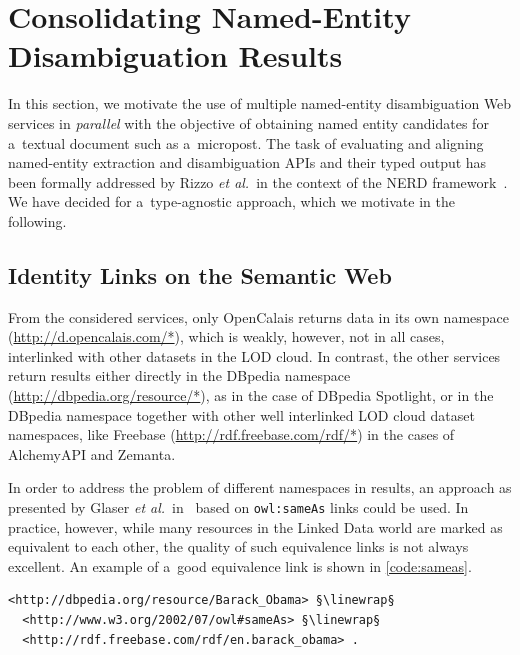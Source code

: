 \section{Consolidating Named-Entity Disambiguation Results} 
\label{sec:consolidate}

In this section, we motivate the use of multiple
named-entity disambiguation Web services in \emph{parallel}
with the objective of obtaining named entity candidates
for a~textual document such as a~micropost.
The task of evaluating and aligning named-entity extraction and
disambiguation APIs and their typed output
has been formally addressed by Rizzo \emph{et al.}\
in the context of the NERD
framework~\cite{rizzo2011nerd,rizzo2012nerd}.
We have decided for a~type-agnostic approach,
which we motivate in the following.

\subsection{Identity Links on the Semantic Web}
\label{sec:sameasorg}

From the considered services, only OpenCalais returns data in its
own namespace (\url{http://d.opencalais.com/*}), which is
weakly, however, not in all cases,
interlinked with other datasets in the LOD cloud.
In contrast, the other services return results either directly
in the DBpedia namespace (\url{http://dbpedia.org/resource/*}),
as in the case of DBpedia Spotlight,
or in the DBpedia namespace together with other
well interlinked LOD cloud dataset namespaces, like Freebase
(\url{http://rdf.freebase.com/rdf/*}) in the cases of
AlchemyAPI and Zemanta.

In order to address the problem of different namespaces in results,
an approach as presented by Glaser \emph{et al.}\ 
in~\cite{glaser2009sameas} based on \texttt{owl:sameAs} links
could be used.
In practice, however, while many resources in the Linked Data
world are marked as equivalent to each other,
the quality of such equivalence links is not always excellent.
An example of a~good equivalence link is shown in \autoref{code:sameas}.

\begin{lstlisting}[caption={Example of a~good equivalence link},
  label={code:sameas},
  escapechar=§]
<http://dbpedia.org/resource/Barack_Obama> §\linewrap§
  <http://www.w3.org/2002/07/owl#sameAs> §\linewrap§
  <http://rdf.freebase.com/rdf/en.barack_obama> .
\end{lstlisting}

